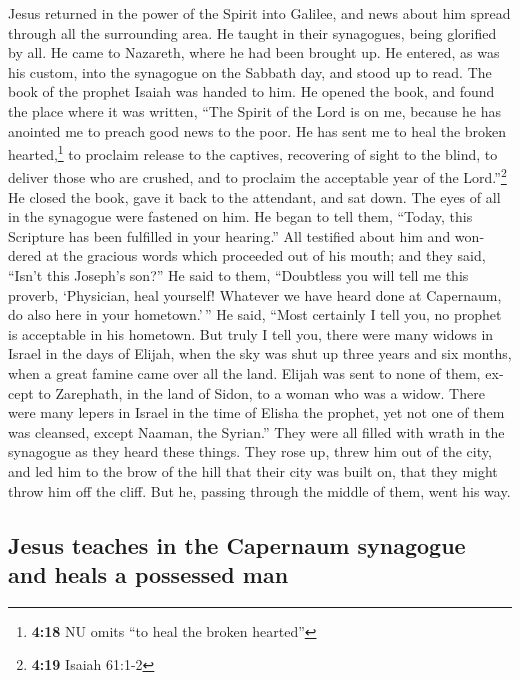\begin{paracol}{2}
\begin{otherlanguage}{english}
 Jesus returned in the power of the Spirit into Galilee,
and news about him spread through all the surrounding area.
 He taught in their synagogues, being glorified by all.
 He came to Nazareth, where he had been brought up. He
entered, as was his custom, into the synagogue on the Sabbath day, and
stood up to read.  The book of the prophet Isaiah was
handed to him. He opened the book, and found the place where it was
written,  ``The Spirit of the Lord is on me, because he
has anointed me to preach good news to the poor. He has sent me to heal
the broken hearted,\footnote{\textbf{4:18} NU omits ``to heal the broken
  hearted''} to proclaim release to the captives, recovering of sight to
the blind, to deliver those who are crushed,  and to
proclaim the acceptable year of the Lord.''\footnote{\textbf{4:19}
  Isaiah 61:1-2}  He closed the book, gave it back to the
attendant, and sat down. The eyes of all in the synagogue were fastened
on him.  He began to tell them, ``Today, this Scripture
has been fulfilled in your hearing.''  All testified
about him and wondered at the gracious words which proceeded out of his
mouth; and they said, ``Isn't this Joseph's son?''  He
said to them, ``Doubtless you will tell me this proverb, `Physician,
heal yourself! Whatever we have heard done at Capernaum, do also here in
your hometown.'\,''  He said, ``Most certainly I tell
you, no prophet is acceptable in his hometown.  But truly
I tell you, there were many widows in Israel in the days of Elijah, when
the sky was shut up three years and six months, when a great famine came
over all the land.  Elijah was sent to none of them,
except to Zarephath, in the land of Sidon, to a woman who was a widow.
 There were many lepers in Israel in the time of Elisha
the prophet, yet not one of them was cleansed, except Naaman, the
Syrian.''  They were all filled with wrath in the
synagogue as they heard these things.  They rose up,
threw him out of the city, and led him to the brow of the hill that
their city was built on, that they might throw him off the cliff.
 But he, passing through the middle of them, went his
way.

\hypertarget{jesus-teaches-in-the-capernaum-synagogue-and-heals-a-possessed-man}{%
\subsection{Jesus teaches in the Capernaum synagogue and heals a
possessed
man}\label{jesus-teaches-in-the-capernaum-synagogue-and-heals-a-possessed-man}}


\end{otherlanguage}
\end{paracol}
